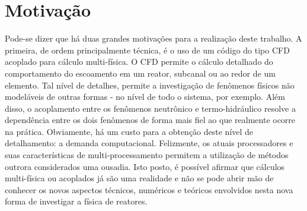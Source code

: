 %

\section{Motivação}

Pode-se dizer que há duas grandes motivações para a realização deste trabalho. A primeira, de ordem principalmente
técnica, é o uso de um código do tipo CFD acoplado para cálculo multi-física. O CFD permite o cálculo detalhado do
comportamento do escoamento em um reator, subcanal ou ao redor de um elemento. Tal nível de detalhes, permite a
investigação de fenômenos físicos não modeláveis de outras formas - no nível de todo o sistema, por exemplo. Além disso,
o acoplamento entre os fenômenos neutrônico e termo-hidráulico resolve a dependência entre os dois fenômenos de forma
mais fiel ao que realmente ocorre na prática. Obviamente, há um custo para a obtenção deste nível de detalhamento: a
demanda computacional. Felizmente, os atuais processadores e suas características de multi-processamento permitem
a utilização de métodos outrora considerados uma ousadia. Isto posto, é possível afirmar que cálculos multi-física ou
acoplados já são uma realidade e não se pode abrir mão de conhecer os novos aspectos técnicos, numéricos e teóricos
envolvidos nesta nova forma de investigar a física de reatores.


